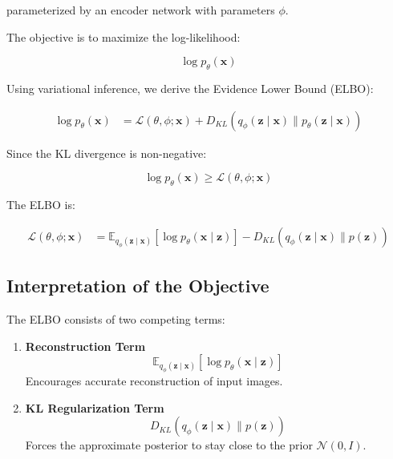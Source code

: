 parameterized by an encoder network with parameters $\phi$.

The objective is to maximize the log-likelihood:

\begin{equation}
\log p_\theta(\mathbf{x})
\end{equation}

Using variational inference, we derive the Evidence Lower Bound (ELBO):

\begin{align}
\log p_\theta(\mathbf{x})
&= \mathcal{L}(\theta, \phi; \mathbf{x})
+ D_{KL}\left(q_\phi(\mathbf{z} \mid \mathbf{x}) \| p_\theta(\mathbf{z} \mid \mathbf{x})\right)
\end{align}

Since the KL divergence is non-negative:

\begin{equation}
\log p_\theta(\mathbf{x}) \geq \mathcal{L}(\theta, \phi; \mathbf{x})
\end{equation}

The ELBO is:

\begin{align}
\mathcal{L}(\theta, \phi; \mathbf{x})
&= \mathbb{E}_{q_\phi(\mathbf{z} \mid \mathbf{x})}
    \left[ \log p_\theta(\mathbf{x} \mid \mathbf{z}) \right]
- D_{KL}\left(q_\phi(\mathbf{z} \mid \mathbf{x}) \| p(\mathbf{z})\right)
\end{align}

\subsection{Interpretation of the Objective}

The ELBO consists of two competing terms:

\begin{enumerate}
    \item \textbf{Reconstruction Term}
    \begin{equation}
    \mathbb{E}_{q_\phi(\mathbf{z} \mid \mathbf{x})}
    \left[ \log p_\theta(\mathbf{x} \mid \mathbf{z}) \right]
    \end{equation}
    Encourages accurate reconstruction of input images.
    
    \item \textbf{KL Regularization Term}
    \begin{equation}
    D_{KL}\left(q_\phi(\mathbf{z} \mid \mathbf{x}) \| p(\mathbf{z})\right)
    \end{equation}
    Forces the approximate posterior to stay close to the prior $\mathcal{N}(0, I)$.
\end{enumerate}

